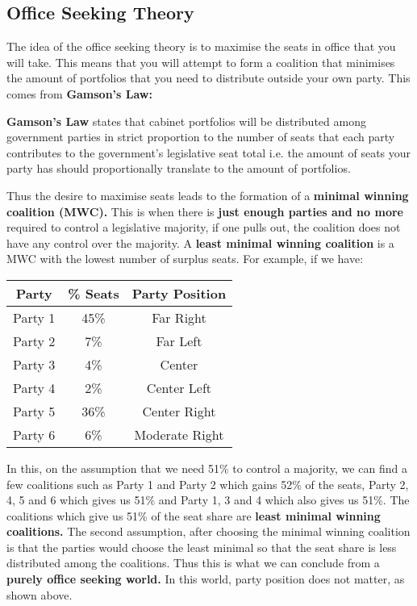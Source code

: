 \documentclass[12pt, letterpaper]{article}
\begin{document}
\subsection{Office Seeking Theory}
The idea of the office seeking theory is to maximise the seats in office that you will take. This means that you will attempt to form a coalition that minimises the amount of portfolios that you need to distribute outside your own party. This comes from \textbf{Gamson's Law:}
\begin{center}
	\textbf{Gamson's Law} states that cabinet portfolios will be distributed among government parties in strict proportion to the number of seats that each party contributes to the government's legislative seat total i.e. the amount of seats your party has should proportionally translate to the amount of portfolios.
\end{center}
Thus the desire to maximise seats leads to the formation of a \textbf{minimal winning coalition (MWC).} This is when there is \textbf{just enough parties and no more} required to control a legislative majority, if one pulls out, the coalition does not have any control over the majority. A \textbf{least minimal winning coalition} is a MWC with the lowest number of surplus seats. For example, if we have:
\begin{center}
\begin{tabular}{|c|c|c|}

\hline
Party & \% Seats & Party Position\\
\hline
Party 1 & 45\% & Far Right\\
\hline
Party 2 & 7\% & Far Left\\
\hline
Party 3 & 4\% & Center\\
\hline
Party 4 & 2\% & Center Left\\
\hline
Party 5 & 36\% & Center Right\\
\hline
Party 6 & 6\% & Moderate Right\\
\hline

\end{tabular}
\end{center}

In this, on the assumption that we need 51\% to control a majority, we can find a few coalitions such as Party 1 and Party 2 which gains 52\% of the seats, Party 2, 4, 5 and 6 which gives us 51\% and Party 1, 3 and 4 which also gives us 51\%. The coalitions which give us 51\% of the seat share are \textbf{least minimal winning coalitions.} The second assumption, after choosing the minimal winning coalition is that the parties would choose the least minimal so that the seat share is less distributed among the coalitions. Thus this is what we can conclude from a \textbf{purely office seeking world.} In this world, party position does not matter, as shown above.
\end{document}
